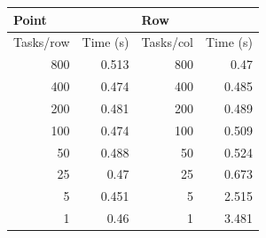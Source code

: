 \documentclass{article}
\begin{document}
\begin{table}[h!]
\centering
\begin{tabular}{|r|r|r|r|}
\hline
\multicolumn{2}{|l}{Point}                                    & \multicolumn{1}{|l}{Row}       & \multicolumn{1}{l|}{}          \\ \hline
\multicolumn{1}{|l|}{Tasks/row} & \multicolumn{1}{l|}{Time (s)} & \multicolumn{1}{l|}{Tasks/col} & \multicolumn{1}{l|}{Time (s)}  \\ \hline
800                           & 0.513                        & 800                           & 0.47                          \\ \hline
400                           & 0.474                        & 400                           & 0.485                         \\ \hline
200                           & 0.481                        & 200                           & 0.489                         \\ \hline
100                           & 0.474                        & 100                           & 0.509                         \\ \hline
50                            & 0.488                        & 50                            & 0.524                         \\ \hline
25                            & 0.47                         & 25                            & 0.673                         \\ \hline
5                             & 0.451                        & 5                             & 2.515                         \\ \hline
1                             & 0.46                         & 1                             & 3.481  \\ \hline                   
\end{tabular}
\end{table}


\newpage
\end{document}
